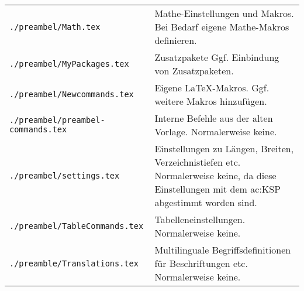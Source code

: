 \begin{longtable}{l@{\extracolsep{8pt}}X}
\texttt{./preambel/Math.tex}              & Mathe-Einstellungen und Makros.
                                          Bei Bedarf eigene Mathe-Makros definieren.\\
\texttt{./preambel/MyPackages.tex}        & Zusatzpakete
                                          Ggf. Einbindung von Zusatzpaketen.\\
\texttt{./preambel/Newcommands.tex}       & Eigene \LaTeX{}-Makros.
                                          Ggf. weitere Makros hinzufügen.\\
\texttt{./preambel/preambel-commands.tex} & Interne Befehle aus der alten Vorlage.
                                          Normalerweise keine.\\
\texttt{./preambel/settings.tex}          & Einstellungen zu Längen, Breiten, Verzeichnistiefen etc.
                                          Normalerweise keine, da diese Einstellungen mit dem \gls{ac:KSP} abgestimmt worden sind.\\
\texttt{./preambel/TableCommands.tex}     & Tabelleneinstellungen.
                                          Normalerweise keine.\\
\texttt{./preamble/Translations.tex}      & Multilinguale Begriffsdefinitionen für Beschriftungen etc.
                                          Normalerweise keine.\\
\bottomrule%
\end{longtable}%